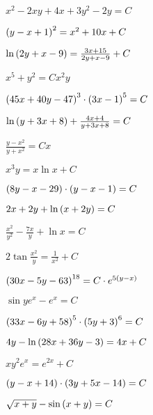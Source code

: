 \begin{enumsols}
		\item \( x^2 - 2xy + 4x + 3y^2 - 2y = C \) %
		\item \( \left( y - x + 1 \right)^2 = x^2 + 10x + C \) %
		\item \( \ln\left( 2y + x - 9 \right) = \frac{3x + 15}{2y + x - 9} + C \) %
		\item \( x^5 + y^2 = C x^2 y \) %
		\item \( \left( 45x + 40y - 47 \right)^{3} \cdot \left( 3x - 1 \right)^{5} = C \) %
		\item \( \ln\left( y + 3x + 8 \right) + \frac{ 4x + 4 }{y + 3x + 8} = C \) %
		\item \( \frac{y - x^2}{y + x^2} = Cx \) %
		\item \( x^3 y = x \ln{x} + C \) %
		\item \( \left( 8y - x - 29 \right) \cdot \left( y - x - 1 \right) = C \) %
		\item \( 2x + 2y + \ln\left( x + 2y \right) = C \) %
		\item \( \frac{x^2}{y^2} - \frac{7x}{y} + \ln{x} = C \) %
		\item \( 2 \tan{\frac{x^2}{y}} = \frac{1}{x^2} + C \) %
		\item \( \left( 30x - 5y - 63 \right)^{18} = C \cdot e^{5\left( y - x \right)} \) %
		\item \( \sin{ye^{x}} - e^{x} = C \) %
		\item \( \left( 33x - 6y + 58 \right)^{5} \cdot \left( 5y + 3 \right)^{6} = C \) %
		\item \( 4y - \ln\left( 28x + 36y - 3 \right) = 4x + C \) %
		\item \( xy^2 e^{x} = e^{2x} + C \) %
		\item \( \left( y - x + 14 \right) \cdot \left( 3y + 5x - 14 \right) = C \) %
		\item \( \sqrt{x + y} - \sin{ \left( x + y \right) } = C \) %


\end{enumsols}

